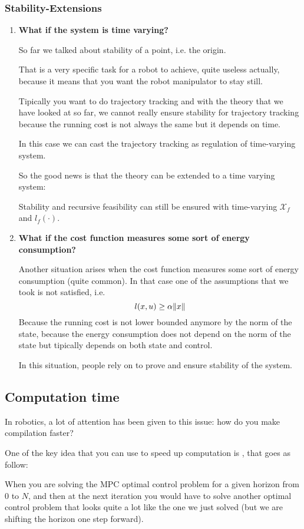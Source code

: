 \subsubsection{Stability-Extensions}
\begin{enumerate}
\item \textbf{What if the system is time varying?}

So far we talked about stability of a point, i.e. the origin.

That is a very specific task for a robot to achieve, quite useless actually, because it means that you want the robot manipulator to stay still.

Tipically you want to do trajectory tracking and with the theory that we have looked at so far, we cannot really ensure stability for trajectory tracking because the running cost is not always the same but it depends on time.

In this case we can cast the trajectory tracking as regulation of time-varying system.

So the good news is that the theory can be extended to a time varying system:

Stability and recursive feasibility can still be ensured with time-varying $\mathcal{X}_f$ and $l_f(\cdot)$.
\item \textbf{What if the cost function measures some sort of energy consumption?}

Another situation arises when the cost function measures some sort of energy consumption (quite common). In that case one of the assumptions that we took is not satisfied, i.e.
\[l(x,u) \ge\alpha \lVert x\rVert\]
Because the running cost is not lower bounded anymore by the norm of the state, because the energy consumption does not depend on the norm of the state but tipically depends on both state and control.

In this situation, people rely on  to prove and ensure stability of the system.  
\end{enumerate}

\subsection{Computation time}
In robotics, a lot of attention has been given to this issue: how do you make compilation faster?

One of the key idea that you can use to speed up computation is , that goes as follow:

When you are solving the MPC optimal control problem for a given horizon from $0$ to $N$, and then at the next iteration you would have to solve another optimal control problem that looks quite a lot like the one we just solved (but we are shifting the horizon one step forward).

